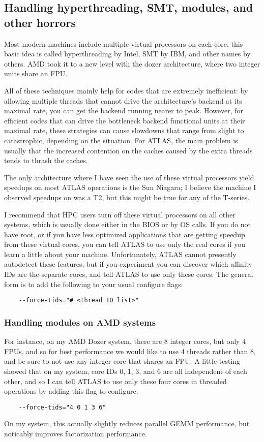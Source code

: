 \documentclass[11pt]{article}
\begin{document}
\clearpage
\subsection{Handling hyperthreading, SMT, modules, and other horrors}
\label{sec-tids}
Most modern machines include multiple virtual processors on each core;
this basic idea is called hyperthreading by Intel, SMT by IBM, and other
names by others.  AMD took it to a new level with the dozer architecture,
where two integer units share an FPU.

All of these techniques mainly help for codes that are extremely inefficient:
by allowing multiple threads that cannot drive the architecture's backend at 
its maximal rate, you can get the backend running nearer to peak.  However,
for efficient codes that can drive the bottleneck backend functional units
at their maximal rate, these strategies can cause slowdowns that range
from slight to catastrophic, depending on the situation.  For ATLAS,
the main problem is usually that the increased contention on the caches 
caused by the extra threads tends to thrash the caches.

The only architecture where I have seen the use of these virtual processors
yield speedups on most ATLAS operations is the Sun Niagara;  I believe the
machine I observed speedups on was a T2, but this might be true for any
of the T-series.

I recommend that HPC users turn off these virtual processors on all other
systems, which is usually done either in the BIOS or by OS calls.  If
you do not have root, or if you have less optimized applications that are
getting speedup from these virtual cores, you can tell ATLAS to use only
the real cores if you learn a little about your machine.  Unfortunately,
ATLAS cannot presently autodetect these features, but if you experiment
you can discover which affinity IDs are the separate cores, and tell
ATLAS to use only these cores.  The general form is to add the following
to your usual configure flags:
\begin{verbatim}
    --force-tids="# <thread ID list>"
\end{verbatim}

\subsubsection{Handling modules on AMD systems}
For instance, on my AMD Dozer system,
there are 8 integer cores, but only 4 FPUs, and so for best performance we
would like to use 4 threads rather than 8, and be sure to not use any
integer core that shares an FPU.  A little testing showed that on my
system, core IDs 0, 1, 3, and 6 are all independent of each other, and so
I can tell ATLAS to use only these four cores in threaded operations by
adding this flag to configure:
\begin{verbatim}
    --force-tids="4 0 1 3 6"
\end{verbatim}
On my system, this actually slightly reduces parallel GEMM performance, but
noticably improves factorization performance.
\end{document}
